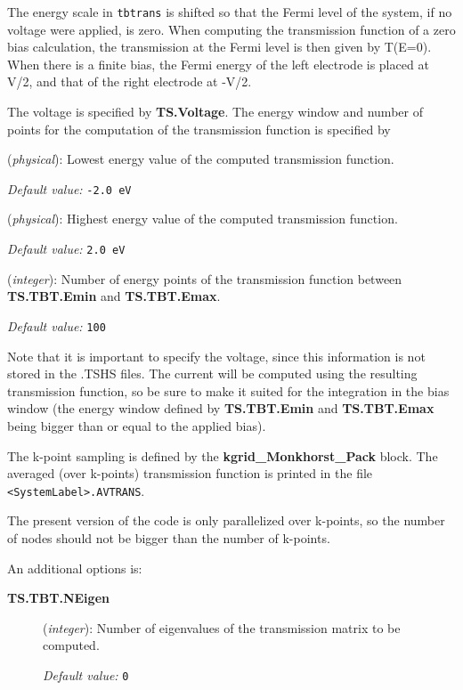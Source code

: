 \documentclass[11pt]{article}
\begin{document}
The energy scale in {\tt tbtrans} is shifted so that the Fermi level
of the system, if no voltage were applied, is zero. When computing the
transmission function of a zero bias calculation, the transmission at
the Fermi level is then given by T(E=0). When there is a finite bias,
the Fermi energy of the left electrode is placed at V/2, and that of
the right electrode at -V/2.

The voltage is specified by {\bf TS.Voltage}. The energy window and
number of points for the computation of the transmission function is
specified by
\begin{description}
    \itemsep 10pt
    \parsep 0pt

\item [{\bf TS.TBT.Emin}]({\it physical}): Lowest energy value of the
  computed transmission function.  

{\it Default value:} {\tt -2.0 eV}

\item [{\bf TS.TBT.Emax}]({\it physical}): Highest energy value of the
  computed transmission function.  

{\it Default value:} {\tt 2.0 eV}

\item [{\bf TS.TBT.NPoints}]({\it integer}): Number of energy points
  of the transmission function between {\bf TS.TBT.Emin} and {\bf
    TS.TBT.Emax}.  

{\it Default value:} {\tt 100}
\end{description}
Note that it is important to specify the voltage, since this
information is not stored in the .TSHS files. The current will be
computed using the resulting transmission function, so be sure to make
it suited for the integration in the bias window (the energy window
defined by {\bf TS.TBT.Emin} and {\bf TS.TBT.Emax} being bigger than
or equal to the applied bias).

The k-point sampling is defined by the {\bf kgrid\_Monkhorst\_Pack}
block. The averaged (over k-points) transmission function is printed
in the file {\tt <SystemLabel>.AVTRANS}.

The present version of the code is only parallelized over 
k-points, so the number of nodes should not be bigger than 
the number of k-points.

An additional options is:
\begin{description}
 \item [{\bf TS.TBT.NEigen}]({\it integer}): Number of eigenvalues of
   the transmission matrix to be computed.  

{\it Default value:} {\tt 0}
\end{description}
\end{document}
